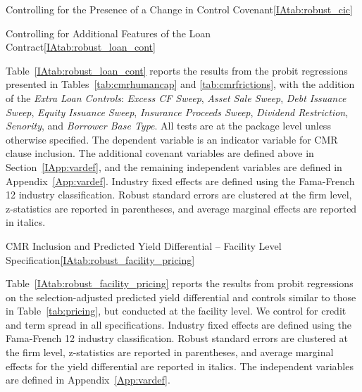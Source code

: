 \documentclass[12pt]{article}
\begin{document}
\begin{appendices}
\begin{singlespace}
\begin{papertable}{Controlling for the Presence of a Change in Control Covenant}{\ref{IAtab:robust_cic}}{}
  \startdata
  
\end{papertable}





\begin{papertable}{Controlling for Additional Features of the Loan Contract}{\ref{IAtab:robust_loan_cont}}{}
  \label{IAtab:robust_loan_cont}

  Table~\ref{IAtab:robust_loan_cont} reports the results from the probit regressions presented in Tables~\ref{tab:cmrhumancap} and \ref{tab:cmrfrictions}, with the addition of the \textit{Extra Loan Controls}: \textit{Excess CF Sweep}, \textit{Asset Sale Sweep}, \textit{Debt Issuance Sweep}, \textit{Equity Issuance Sweep}, \textit{Insurance Proceeds Sweep}, \textit{Dividend Restriction}, \textit{Senority}, and \textit{Borrower Base Type}.
  All tests are at the package level unless otherwise specified.
  The dependent variable is an indicator variable for CMR clause inclusion.
  The additional covenant variables are defined above in Section~\ref{IApp:vardef}, and the remaining independent variables are defined in Appendix~\ref{App:vardef}.
  Industry fixed effects are defined using the Fama-French 12 industry classification.
  Robust standard errors are clustered at the firm level, z-statistics are reported in parentheses, and average marginal effects are reported in italics.
  \postamblesig

  \startdata
  
\end{papertable}





\begin{papertable}{CMR Inclusion and Predicted Yield Differential -- Facility Level Specification}{\ref{IAtab:robust_facility_pricing}}{}
  \label{IAtab:robust_facility_pricing}

  Table~\ref{IAtab:robust_facility_pricing} reports the results from probit regressions on the selection-adjusted predicted yield differential and controls similar to those in Table~\ref{tab:pricing}, but conducted at the facility level.
  We control for credit and term spread in all specifications.
  Industry fixed effects are defined using the Fama-French 12 industry classification.
  Robust standard errors are clustered at the firm level, z-statistics are reported in parentheses, and average marginal effects for the yield differential are reported in italics.
  The independent variables are defined in Appendix~\ref{App:vardef}.
  \postamblesig


\end{papertable}
\end{singlespace}
\end{appendices}
\end{document}
